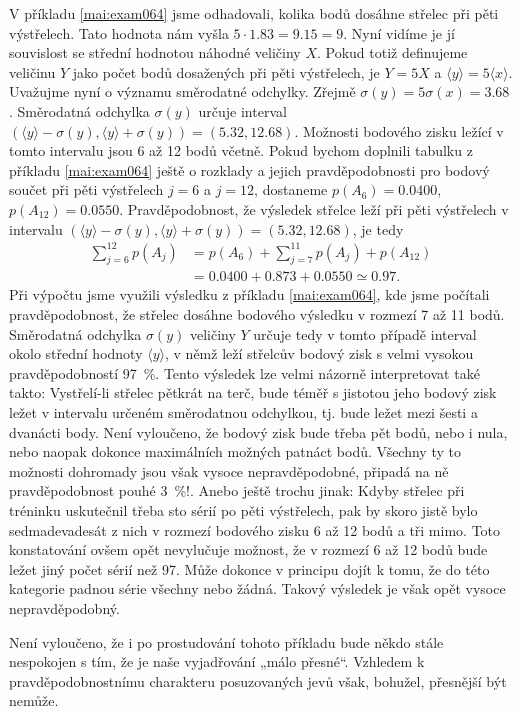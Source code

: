 \begin{mdframed}[style=mdexam]
\begin{example}
    V příkladu \ref{mai:exam064} jsme odhadovali, kolika bodů dosáhne střelec při pěti výstřelech.
    Tato hodnota nám vyšla \(\num{5}\cdot\num{1.83} = \num{9.15} = 9\). Nyní vidíme je jí souvislost
    se střední hodnotou náhodné veličiny \(X\). Pokud totiž definujeme veličinu \(Y\) jako počet
    bodů dosažených při pěti výstřelech, je \(Y = 5X\) a \(\langle y \rangle = 5\langle x \rangle\).
    Uvažujme nyní o významu směrodatné odchylky. Zřejmě \(\sigma(y) = 5\sigma(x) = \num{3.68}\).
    Směrodatná odchylka \(\sigma(y)\) určuje interval \((\langle y \rangle - \sigma(y), \langle y
    \rangle + \sigma(y)) = (\num{5.32}, \num{12.68})\). Možnosti bodového zisku ležící v tomto
    intervalu jsou \num{6} až \num{12} bodů včetně. Pokud bychom doplnili tabulku z příkladu
    \ref{mai:exam064} ještě o rozklady a jejich pravděpodobnosti pro bodový součet při pěti
    výstřelech \(j = \num{6}\) a \(j = \num{12}\), dostaneme \(p(A_6) = \num{0.0400}\), \(p(A_{12})
    = \num{0.0550}\). Pravděpodobnost, že výsledek střelce leží při pěti výstřelech v intervalu
    \((\langle y \rangle - \sigma(y), \langle y \rangle + \sigma(y)) = (\num{5.32}, \num{12.68})\),
    je tedy
    \begin{align*}
      \sum_{j=6}^{12}p(A_j) &= p(A_6) + \sum_{j=7}^{11}p(A_j) + p(A_{12})                \\
                            &= \num{0.0400} + \num{0.873} + \num{0.0550} \simeq \num{0.97}.
    \end{align*}
    Při výpočtu jsme využili výsledku z příkladu \ref{mai:exam064}, kde jsme počítali
    pravděpodobnost, že střelec dosáhne bodového výsledku v rozmezí \num{7} až \num{11} bodů.
    Směrodatná odchylka \(\sigma(y)\) veličiny \(Y\) určuje tedy v tomto případě interval okolo
    střední hodnoty \(\langle y \rangle\), v němž leží střelcův bodový zisk s velmi vysokou
    pravděpodobností \SI{97}{\percent}. Tento výsledek lze velmi názorně interpretovat také takto:
    Vystřelí-li střelec pětkrát na terč, bude téměř s jistotou jeho bodový zisk ležet v intervalu
    určeném směrodatnou odchylkou, tj. bude ležet mezi šesti a dvanácti body. Není vyloučeno, že
    bodový zisk bude třeba pět bodů, nebo i nula, nebo naopak dokonce maximálních možných patnáct
    bodů. Všechny ty to možnosti dohromady jsou však vysoce nepravděpodobné, připadá na ně
    pravděpodobnost pouhé \SI{3}{\percent}!. Anebo ještě trochu jinak: Kdyby střelec při tréninku
    uskutečnil třeba sto sérií po pěti výstřelech, pak by skoro jistě bylo sedmadevadesát z nich v
    rozmezí bodového zisku \num{6} až \num{12} bodů a tři mimo. Toto konstatování ovšem opět
    nevylučuje možnost, že v rozmezí \num{6} až \num{12} bodů bude ležet jiný počet sérií než
    \num{97}. Může dokonce v principu dojít k tomu, že do této kategorie padnou série všechny nebo
    žádná. Takový výsledek je však opět vysoce nepravděpodobný.
    
    Není vyloučeno, že i po prostudování tohoto příkladu bude někdo stále nespokojen s tím, že je
    naše vyjadřování „málo přesné“. Vzhledem k pravděpodobnostnímu charakteru posuzovaných jevů
    však, bohužel, přesnější být nemůže.
  \end{example}
\end{mdframed}
